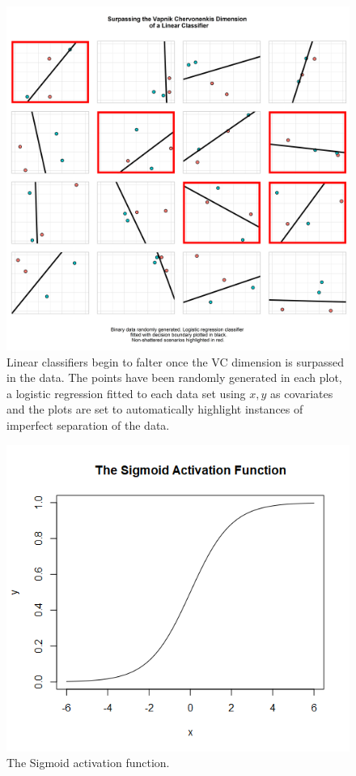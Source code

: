 \begin{figure}[H]
    \centering
    \includegraphics[width=120mm]{figs/vc_4.png}
    \caption[Surpassing the \gls{vc} dimension of a linear classifier - the data is not always shattered.]{Linear classifiers begin to falter once the VC dimension is surpassed in the data. The points have been randomly generated in each plot, a logistic regression fitted to each data set using $x, y$ as covariates and the plots are set to automatically highlight instances of imperfect separation of the data.}
    \label{fig:vc_3}
\end{figure}

\begin{figure}
    \includegraphics[scale=0.5]{figs/sigmoid.png}
    \caption{The Sigmoid activation function.}
    \label{fig:sigmoid_function}
\end{figure}

